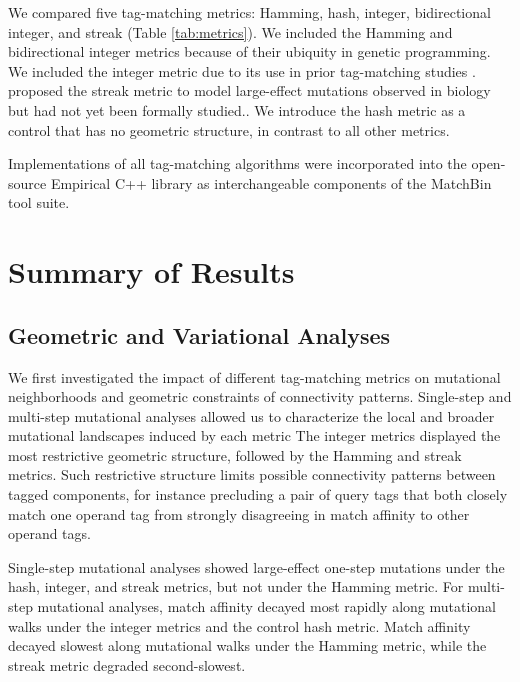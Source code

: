 

We compared five tag-matching metrics: Hamming, hash, integer, bidirectional integer, and streak (Table \ref{tab:metrics}).
We included the Hamming and bidirectional integer metrics because of their ubiquity in genetic programming.
We included the integer metric due to its use in prior tag-matching studies \citep{spector2011tag,spector2012tag}.
\cite{downing2015intelligence} proposed the streak metric to model large-effect mutations observed in biology but had not yet been formally studied..
We introduce the hash metric as a control that has no geometric structure, in contrast to all other metrics.

Implementations of all tag-matching algorithms were incorporated into the open-source Empirical C++ library \citep{charles_ofria_2019_2575607} as interchangeable components of the MatchBin tool suite.

\section{Summary of Results}


\subsection{Geometric and Variational Analyses}

We first investigated the impact of different tag-matching metrics on mutational neighborhoods and geometric constraints of connectivity patterns.
Single-step and multi-step mutational analyses allowed us to characterize the local and broader mutational landscapes induced by each metric
The integer metrics displayed the most restrictive geometric structure, followed by the Hamming and streak metrics.
Such restrictive structure limits possible connectivity patterns between tagged components, for instance precluding a pair of query tags that both closely match one operand tag from strongly disagreeing in match affinity to other operand tags.

Single-step mutational analyses showed large-effect one-step mutations under the hash, integer, and streak metrics, but not under the Hamming metric.
For multi-step mutational analyses, match affinity decayed most rapidly along mutational walks under the integer metrics and the control hash metric.
Match affinity decayed slowest along mutational walks under the Hamming metric, while the streak metric degraded second-slowest.

